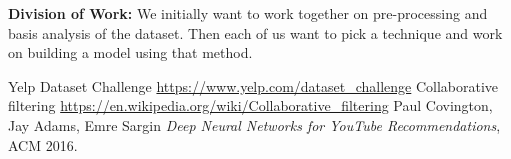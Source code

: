 \documentclass[11pt]{article}
\begin{document}
	\noindent\textbf{Division of Work:}
	We initially want to work together on pre-processing and basis analysis of the dataset. Then each of us want to pick a technique and work on building a model using that method.
	\begin{thebibliography}{9}
		
		 Yelp Dataset Challenge \url{https://www.yelp.com/dataset_challenge}
		Collaborative filtering \url{https://en.wikipedia.org/wiki/Collaborative_filtering}
		 Paul Covington, Jay Adams, Emre Sargin \textit{Deep Neural Networks for YouTube Recommendations}, ACM 2016.

		
	\end{thebibliography}
	
	
	
	
	
	
	
\end{document}
